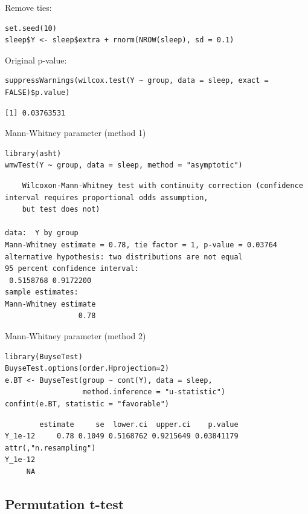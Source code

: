 \documentclass{article}
\begin{document}
Remove ties:
\lstset{language=r,label= ,caption= ,captionpos=b,numbers=none}
\begin{lstlisting}
set.seed(10)
sleep$Y <- sleep$extra + rnorm(NROW(sleep), sd = 0.1)
\end{lstlisting}

Original p-value:
\lstset{language=r,label= ,caption= ,captionpos=b,numbers=none}
\begin{lstlisting}
suppressWarnings(wilcox.test(Y ~ group, data = sleep, exact = FALSE)$p.value)
\end{lstlisting}

\begin{verbatim}
[1] 0.03763531
\end{verbatim}

Mann-Whitney parameter (method 1)
\lstset{language=r,label= ,caption= ,captionpos=b,numbers=none}
\begin{lstlisting}
library(asht)
wmwTest(Y ~ group, data = sleep, method = "asymptotic")
\end{lstlisting}

\begin{verbatim}
	Wilcoxon-Mann-Whitney test with continuity correction (confidence interval requires proportional odds assumption,
	but test does not)

data:  Y by group
Mann-Whitney estimate = 0.78, tie factor = 1, p-value = 0.03764
alternative hypothesis: two distributions are not equal
95 percent confidence interval:
 0.5158768 0.9172200
sample estimates:
Mann-Whitney estimate 
                 0.78
\end{verbatim}

Mann-Whitney parameter (method 2)
\lstset{language=r,label= ,caption= ,captionpos=b,numbers=none}
\begin{lstlisting}
library(BuyseTest)
BuyseTest.options(order.Hprojection=2)
e.BT <- BuyseTest(group ~ cont(Y), data = sleep, 
				  method.inference = "u-statistic")
confint(e.BT, statistic = "favorable")
\end{lstlisting}

\begin{verbatim}
        estimate     se  lower.ci  upper.ci    p.value
Y_1e-12     0.78 0.1049 0.5168762 0.9215649 0.03841179
attr(,"n.resampling")
Y_1e-12 
     NA
\end{verbatim}


\subsection{Permutation t-test}
\label{sec:orgcbd83f1}
\end{document}
